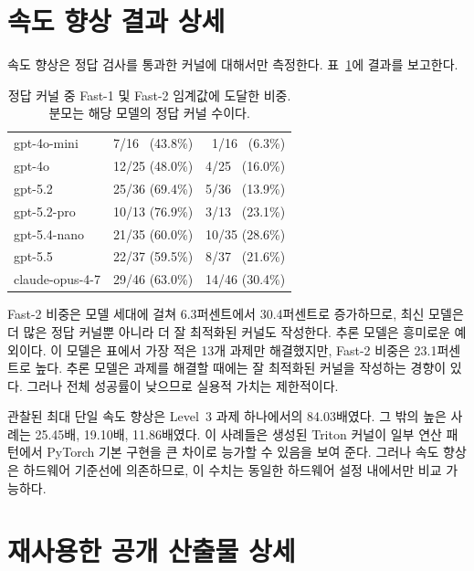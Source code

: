 \section{속도 향상 결과 상세}

속도 향상은 정답 검사를 통과한 커널에 대해서만 측정한다. 표~\ref{tab:fast}에 결과를
보고한다.

\begin{table}[h]
\centering
\small
\setlength{\tabcolsep}{6pt}
\caption{정답 커널 중 Fast-1 및 Fast-2 임계값에 도달한 비중. 분모는 해당 모델의
정답 커널 수이다.}
\label{tab:fast}
\begin{tabular}{@{}lrr@{}}
\toprule
\headrow{모델} & \headrow{Fast-1} & \headrow{Fast-2} \\
\midrule
gpt-4o-mini     & 7/16 \ (43.8\%)  & 1/16 \ (6.3\%)  \\
gpt-4o          & 12/25 (48.0\%)   & 4/25 \ (16.0\%) \\
gpt-5.2         & 25/36 (69.4\%)   & 5/36 \ (13.9\%) \\
gpt-5.2-pro     & 10/13 (76.9\%)   & 3/13 \ (23.1\%) \\
gpt-5.4-nano    & 21/35 (60.0\%)   & 10/35 (28.6\%)  \\
gpt-5.5         & 22/37 (59.5\%)   & 8/37 \ (21.6\%) \\
claude-opus-4-7 & 29/46 (63.0\%)   & 14/46 (30.4\%)  \\
\bottomrule
\end{tabular}
\end{table}

Fast-2 비중은 모델 세대에 걸쳐 6.3퍼센트에서 30.4퍼센트로 증가하므로, 최신 모델은 더 많은 정답
커널뿐 아니라 더 잘 최적화된 커널도 작성한다. 추론 모델은 흥미로운 예외이다. 이 모델은 표에서
가장 적은 13개 과제만 해결했지만, Fast-2 비중은 23.1퍼센트로 높다. 추론 모델은 과제를 해결할 때에는
잘 최적화된 커널을 작성하는 경향이 있다. 그러나 전체 성공률이 낮으므로 실용적 가치는
제한적이다.

관찰된 최대 단일 속도 향상은 Level~3 과제 하나에서의 84.03배였다. 그 밖의 높은 사례는 25.45배,
19.10배, 11.86배였다. 이 사례들은 생성된 Triton 커널이 일부 연산 패턴에서 PyTorch 기본 구현을
큰 차이로 능가할 수 있음을 보여 준다. 그러나 속도 향상은 하드웨어 기준선에 의존하므로, 이 수치는
동일한 하드웨어 설정 내에서만 비교 가능하다.

\section{재사용한 공개 산출물 상세}

